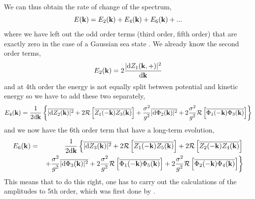 We can thus obtain the rate of change of the spectrum, 
\begin{equation}
 E(\mathbf{k})=E_2(\mathbf{k}) + E_4(\mathbf{k}) + E_6(\mathbf{k}) + ...
\end{equation}
where we have left out the odd order terms (third order, fifth order) that are exactly zero in the case of a Gaussian sea state \citep{Hasselmann1962}.
We already know the second order terms, 
\begin{equation}
E_2(\mathbf{k})=2 \frac{|\mathrm{d} Z_1(\mathbf{k},+)|^2}{\mathrm{d} \mathbf{k}} 
\end{equation}
and at 4th order the energy is not equally split between potential and kinetic energy so we have to add these two separately, 
\begin{equation}
 E_4(\mathbf{k})=\frac{1}{2 \mathrm{d} \mathbf{k}}\left\{\overline{|\mathrm{d} Z_2(\mathbf{k})|^2} + 2 {\cal R}\left[\overline{Z_1(-\mathbf{k}) Z_3(\mathbf{k})}\right]
+ \frac{\sigma^2}{g^2}\overline{|\mathrm{d} \Phi_2(\mathbf{k})|^2} + 2 \frac{\sigma^2}{g^2}{\cal R}\left[\overline{\Phi_1(-\mathbf{k}) \Phi_3(\mathbf{k})}\right] \right\}
\end{equation}
and we now have the 6th order term that have a long-term evolution, 
\begin{eqnarray}
 E_6(\mathbf{k})&=&\frac{1}{2 \mathrm{d} \mathbf{k}}\left\{\overline{|\mathrm{d} Z_3(\mathbf{k})|^2} + 2 {\cal R}\left[\overline{Z_1(-\mathbf{k}) Z_5(\mathbf{k})}\right] + 
2 {\cal R}\left[\overline{Z_2(-\mathbf{k}) Z_4(\mathbf{k})}\right] \right. \nonumber \\
& &\left.
+ \frac{\sigma^2}{g^2}\overline{|\mathrm{d} \Phi_3(\mathbf{k})|^2} + 2 \frac{\sigma^2}{g^2}{\cal R}\left[\overline{\Phi_1(-\mathbf{k}) \Phi_5(\mathbf{k})}\right] 
+ 2 \frac{\sigma^2}{g^2}{\cal R}\left[\overline{\Phi_2(-\mathbf{k}) \Phi_4(\mathbf{k})}\right] \right\}\label{E6}
\end{eqnarray}
This means that to do this right, one has to carry out the calculations of the amplitudes to 5th order, which was first done by \cite{Hasselmann1962}.

